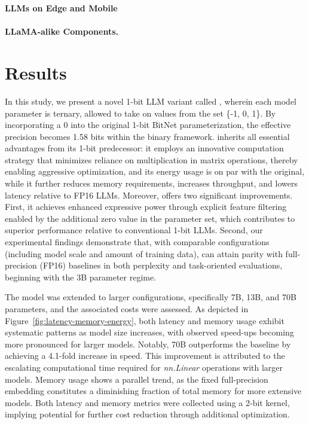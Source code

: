 \textbf{LLMs on Edge and Mobile}

\paragraph{LLaMA-alike Components.}

\section{Results}

In this study, we present a novel 1-bit LLM variant called \textbf{}, wherein each model parameter is ternary, allowed to take on values from the set \{-1, 0, 1\}. By incorporating a 0 into the original 1-bit BitNet parameterization, the effective precision becomes 1.58 bits within the binary framework.  inherits all essential advantages from its 1-bit predecessor: it employs an innovative computation strategy that minimizes reliance on multiplication in matrix operations, thereby enabling aggressive optimization, and its energy usage is on par with the original, while it further reduces memory requirements, increases throughput, and lowers latency relative to FP16 LLMs. Moreover,  offers two significant improvements. First, it achieves enhanced expressive power through explicit feature filtering enabled by the additional zero value in the parameter set, which contributes to superior performance relative to conventional 1-bit LLMs. Second, our experimental findings demonstrate that, with comparable configurations (including model scale and amount of training data),  can attain parity with full-precision (FP16) baselines in both perplexity and task-oriented evaluations, beginning with the 3B parameter regime.

The model was extended to larger configurations, specifically 7B, 13B, and 70B parameters, and the associated costs were assessed. As depicted in Figure~\ref{fig:latency-memory-energy}, both latency and memory usage exhibit systematic patterns as model size increases, with observed speed-ups becoming more pronounced for larger models. Notably,  70B outperforms the  baseline by achieving a 4.1-fold increase in speed. This improvement is attributed to the escalating computational time required for \emph{nn.Linear} operations with larger models. Memory usage shows a parallel trend, as the fixed full-precision embedding constitutes a diminishing fraction of total memory for more extensive models. Both latency and memory metrics were collected using a 2-bit kernel, implying potential for further cost reduction through additional optimization.

